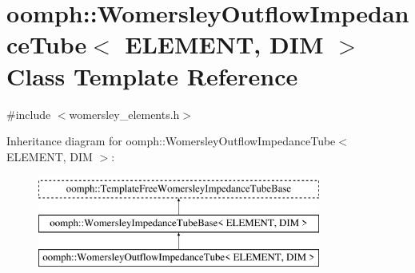 \hypertarget{classoomph_1_1WomersleyOutflowImpedanceTube}{}\section{oomph\+:\+:Womersley\+Outflow\+Impedance\+Tube$<$ E\+L\+E\+M\+E\+NT, D\+IM $>$ Class Template Reference}
\label{classoomph_1_1WomersleyOutflowImpedanceTube}


{\ttfamily \#include $<$womersley\+\_\+elements.\+h$>$}

Inheritance diagram for oomph\+:\+:Womersley\+Outflow\+Impedance\+Tube$<$ E\+L\+E\+M\+E\+NT, D\+IM $>$\+:\begin{figure}[H]
\begin{center}
\leavevmode
\includegraphics[height=3.000000cm]{classoomph_1_1WomersleyOutflowImpedanceTube}
\end{center}
\end{figure}
